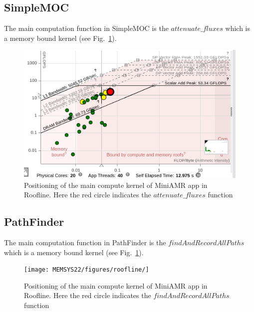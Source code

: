 \subsection{SimpleMOC}
The main computation function in SimpleMOC is the $attenuate\_fluxes$  which is a memory bound kernel (see Fig.~\ref{fig:roof-simplemoc}). 

\begin{figure}[h]%
\begin{center}
\includegraphics[width=1\linewidth]{MEMSYS22/figures/roofline/simplesoc.png}
\end{center}
  \vspace{-0.1in}
\caption{Positioning of the main compute kernel of MiniAMR app in Roofline. Here the red circle indicates the $attenuate\_fluxes$ function }
\label{fig:roof-simplemoc}
\vspace{-0.2in}
\end{figure}

\subsection{PathFinder}
The main computation function in PathFinder is the $findAndRecordAllPaths$  which is a memory bound kernel (see Fig.~\ref{fig:roof-simplemoc}). 

\begin{figure}[h]%
\begin{center}
\texttt{[image: MEMSYS22/figures/roofline/]}
\end{center}
  \vspace{-0.1in}
\caption{Positioning of the main compute kernel of MiniAMR app in Roofline. Here the red circle indicates the $findAndRecordAllPaths$ function }
\label{fig:roof-pathfinder}
\vspace{-0.2in}
\end{figure}



